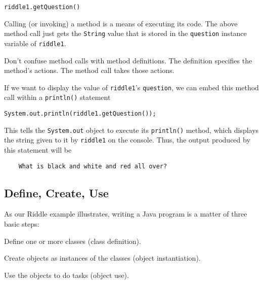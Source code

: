 \begin{jjjlisting}
\begin{lstlisting}
riddle1.getQuestion()
\end{lstlisting}
\end{jjjlisting}

\noindent Calling (or invoking) a method is a means of executing its code.  
The above method call just gets the {\tt String} value that is stored
in the {\tt question} instance variable of {\tt riddle1}.

 {Don't
confuse method calls with method definitions.  The definition specifies
the method's actions.  The method call takes those actions.}

\noindent If we want to display the value of {\tt riddle1}'s {\tt question}, 
we can embed this method call within a {\tt println()} statement

\begin{jjjlisting}
\begin{lstlisting}
System.out.println(riddle1.getQuestion());
\end{lstlisting}
\end{jjjlisting}

\noindent This tells the {\tt System.out} object to execute its
{\tt println()} method, which displays the string given to it by {\tt riddle1}
on the console. Thus, the output produced by this statement will be

\begin{jjjlisting}
\begin{lstlisting}
    What is black and white and red all over?
\end{lstlisting}
\end{jjjlisting}

\subsection{Define, Create, Use}
\label{sect-mantra}
\noindent As our Riddle example illustrates, writing a Java program is a 
matter of three basic steps:

\begin{BL}
\item  Define one or more classes (class definition).
\item  Create objects as instances of the classes (object instantiation).
\item  Use the objects to do tasks (object use).
\end{BL}

